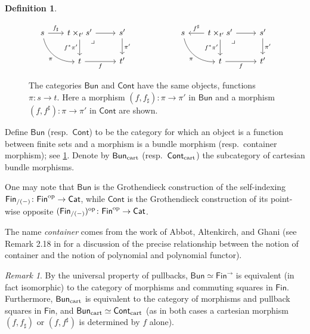 \documentclass[11pt, article, one side]{memoir}
\theoremstyle{theorem}
\theoremstyle{definition}
\newtheorem{definition}[section]{Definition}
\theoremstyle{remark}
\newtheorem{remark}[section]{Remark}
\newcommand{\Cat}[1]{\mathsf{#1}}%
\newcommand{\op}{^\tn{op}}
\newcommand{\tn}[1]{\textnormal{#1}}
\newcommand{\smcat}{\Cat{Cat}}
\newcommand{\fin}{\Cat{Fin}}
\newcommand{\cont}{\Cat{Cont}}
\newcommand{\bun}{\Cat{Bun}}
\begin{document}
\begin{definition}
\begin{figure}
\[
  \begin{tikzcd}
  s\ar[dr, bend right=40pt, "\pi"']&[-5pt]
  t\times_{t'}s'\ar[r]\ar[d, "f^*\pi'"']\ar[from=l, "f_\sharp"]&
  s'\ar[d, "\pi'"]\\&
  t\ar[r, "f"']&
  t'\ar[ul, phantom, very near end, "\lrcorner"]
  \end{tikzcd}
  \hspace{.75in}
  \begin{tikzcd}
  s\ar[dr, bend right=40pt, "\pi"']&[-5pt]
  t\times_{t'}s'\ar[r]\ar[d, "f^*\pi'"']\ar[l, "f^\sharp"']&
  s'\ar[d, "\pi'"]\\&
  t\ar[r, "f"']&
  t'\ar[ul, phantom, very near end, "\lrcorner"]
  \end{tikzcd}
\]
\caption{The categories $\bun$ and $\cont$ have the same objects, functions $\pi\colon s\to t$. Here a morphism $(f,f_\sharp)\colon \pi\to \pi'$ in $\bun$ and a morphism $(f,f^\sharp)\colon \pi\to\pi'$ in $\cont$ are shown.
}
\label{fig.bund_cont_maps}
\end{figure}
Define $\bun$ (resp.\ $\cont$) to be the category for which an object is a function between finite sets and a morphism is a bundle morphism (resp.\ container morphism); see \cref{fig.bund_cont_maps}. Denote by $\bun_{\tn{cart}}$ (resp.\ $\cont_{\tn{cart}}$) the subcategory of cartesian bundle morphisms.
\end{definition}

One may note that $\bun$ is the Grothendieck construction of the self-indexing $\fin_{/(-)} \colon \fin\op \to \smcat$, while $\cont$ is the Grothendieck construction of its point-wise opposite $(\fin_{/(-)})\op \colon \fin\op \to \smcat$.

 The name \emph{container} comes from the work of Abbot, Altenkirch, and Ghani \cites{abbott2003categories}{abbott2005containers}{abbot2003categoriesthesis} (see Remark 2.18 in \cite{kock2012polynomial} for a discussion of the precise relationship between the notion of container and the notion of polynomial and polynomial functor).

\begin{remark}\label{rem.dir_fin2}
By the universal property of pullbacks, $\bun\simeq\fin^{\to}$ is equivalent (in fact isomorphic) to the category of morphisms and commuting squares in $\fin$. Furthermore, $\bun_{\tn{cart}}$ is equivalent to the category of morphisms and pullback squares in $\fin$, and $\bun_{\tn{cart}} \simeq \cont_{\tn{cart}}$ (as in both cases a cartesian morphism $(f, f_{\sharp})$ or $(f, f^{\sharp})$ is determined by $f$ alone).
\end{remark}
\end{document}

